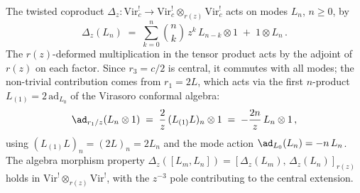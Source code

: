 \begin{proposition}
\label{prop:virasoro-twisted-coproduct}
The twisted coproduct
$\Delta_z \colon \mathrm{Vir}_c^! \to
\mathrm{Vir}_c^! \otimes_{r(z)} \mathrm{Vir}_c^!$
acts on modes $L_n$, $n \ge 0$, by
\begin{equation}\label{eq:virasoro-coproduct-mode}
 \Delta_z(L_n) \;=\;
 \sum_{k=0}^{n} \binom{n}{k}\, z^k\, L_{n-k} \otimes 1
 \;+\; 1 \otimes L_n\,.
\end{equation}
The $r(z)$-deformed multiplication in the tensor
product acts by the adjoint of $r(z)$ on each factor.
Since $r_3 = c/2$ is central, it commutes with all
modes; the non-trivial contribution comes from
$r_1 = 2L$, which acts via the first $n$-product
$L_{(1)} = 2\,\mathrm{ad}_{L_0}$ of the Virasoro
conformal algebra:
\begin{equation}\label{eq:virasoro-r-adjoint}
 \ad_{r_1/z}(L_n \otimes 1)
 \;=\; \frac{2}{z}\,(L_{(1)} L)_n \otimes 1
 \;=\; -\frac{2n}{z}\,L_n \otimes 1\,,
\end{equation}
using $(L_{(1)} L)_n = (2L)_n = 2L_n$ and the mode
action $\ad_{L_0}(L_n) = -n\,L_n$.
The algebra morphism property
$\Delta_z([L_m, L_n])
= [\Delta_z(L_m),\, \Delta_z(L_n)]_{r(z)}$
holds in $\mathrm{Vir}^! \otimes_{r(z)} \mathrm{Vir}^!$,
with the $z^{-3}$ pole contributing to the central
extension.
\end{proposition}


